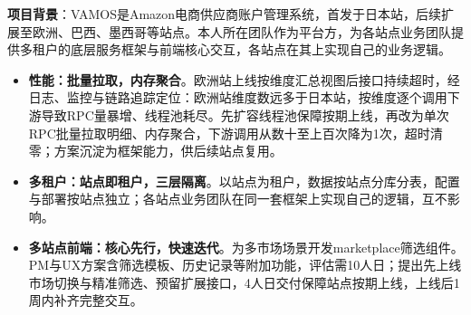 \documentclass{resume}
\begin{document}
\begin{onehalfspacing}
\textbf{项目背景}：VAMOS是Amazon电商供应商账户管理系统，首发于日本站，后续扩展至欧洲、巴西、墨西哥等站点。本人所在团队作为平台方，为各站点业务团队提供多租户的底层服务框架与前端核心交互，各站点在其上实现自己的业务逻辑。\\

\begin{itemize}
    \item \textbf{性能：批量拉取，内存聚合}。欧洲站上线按维度汇总视图后接口持续超时，经日志、监控与链路追踪定位：欧洲站维度数远多于日本站，按维度逐个调用下游导致RPC量暴增、线程池耗尽。先扩容线程池保障按期上线，再改为单次RPC批量拉取明细、内存聚合，下游调用从数十至上百次降为1次，超时清零；方案沉淀为框架能力，供后续站点复用。
    \item \textbf{多租户：站点即租户，三层隔离}。以站点为租户，数据按站点分库分表，配置与部署按站点独立；各站点业务团队在同一套框架上实现自己的逻辑，互不影响。
    \item \textbf{多站点前端：核心先行，快速迭代}。为多市场场景开发marketplace筛选组件。PM与UX方案含筛选模板、历史记录等附加功能，评估需10人日；提出先上线市场切换与精准筛选、预留扩展接口，4人日交付保障站点按期上线，上线后1周内补齐完整交互。
\end{itemize}
\end{onehalfspacing}
\end{document}
